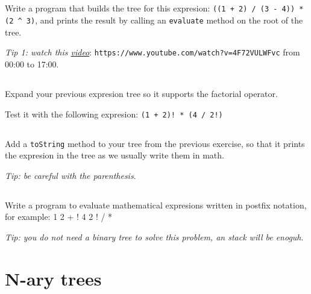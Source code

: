 \documentclass[a4paper, 11pt]{article}
\begin{document}
\subsection{}

Write a program that builds the tree for this expresion: \verb;((1 + 2) / (3 - 4)) * (2 ^ 3);,
and prints the result by calling an \texttt{evaluate} method on
the root of the tree.

\textsl{Tip 1: watch this \href{https://www.youtube.com/watch?v=4F72VULWFvc}{video}}: \verb;https://www.youtube.com/watch?v=4F72VULWFvc; from 00:00 to 17:00.


\subsection{}

Expand your previous expresion tree so it supports the factorial operator.

Test it with the following expresion: \verb;(1 + 2)! * (4 / 2!);


\subsection{}

Add a \texttt{toString} method to your tree from the previous exercise, so that it prints the expresion in the tree as we usually write them in math.

\textsl{Tip: be careful with the parenthesis}.


\subsection{}

Write a program to evaluate mathematical expresions written in postfix notation, \\ for example: 1 2 + ! 4 2 ! / *

\textsl{Tip: you do not need a binary tree to solve this problem, an stack will be enoguh}.






\section{N-ary trees}

\subsection{}
\end{document}
